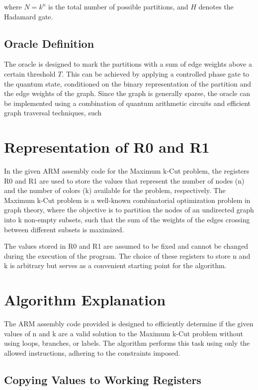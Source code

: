 where $N = k^n$ is the total number of possible partitions, and $H$ denotes the Hadamard gate.

\subsection{Oracle Definition}

The oracle is designed to mark the partitions with a sum of edge weights above a certain threshold $T$. This can be achieved by applying a controlled phase gate to the quantum state, conditioned on the binary representation of the partition and the edge weights of the graph. Since the graph is generally sparse, the oracle can be implemented using a combination of quantum arithmetic circuits and efficient graph traversal techniques, such

\section{Representation of R0 and R1}

In the given ARM assembly code for the Maximum k-Cut problem, the registers R0 and R1 are used to store the values that represent the number of nodes (n) and the number of colors (k) available for the problem, respectively. The Maximum k-Cut problem is a well-known combinatorial optimization problem in graph theory, where the objective is to partition the nodes of an undirected graph into k non-empty subsets, such that the sum of the weights of the edges crossing between different subsets is maximized.

The values stored in R0 and R1 are assumed to be fixed and cannot be changed during the execution of the program. The choice of these registers to store n and k is arbitrary but serves as a convenient starting point for the algorithm.

\section{Algorithm Explanation}

The ARM assembly code provided is designed to efficiently determine if the given values of n and k are a valid solution to the Maximum k-Cut problem without using loops, branches, or labels. The algorithm performs this task using only the allowed instructions, adhering to the constraints imposed.

\subsection{Copying Values to Working Registers}

